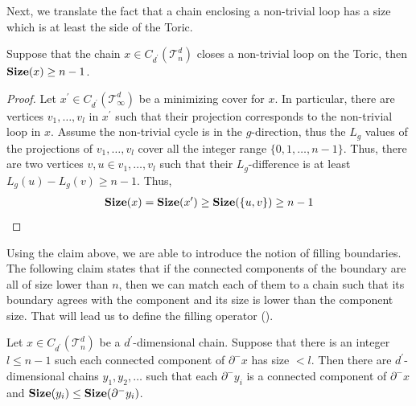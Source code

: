 Next, we translate the fact that a chain enclosing a non-trivial loop has a size which is at least the side of the Toric.
\begin{claim}
  \label{claim:sizenont}
Suppose that the chain $x \in C_{d^{\prime}}(\mathcal{T}_n^d)$ closes a non-trivial loop on the Toric, then $\mathbf{Size}(x) \ge n - 1$.
\end{claim}
\begin{proof}
  Let $x^{\prime} \in C_{d^{\prime}}(\mathcal T_\infty^d)$ be a minimizing cover for $x$. In particular, there are vertices $v_{1}, \ldots, v_{l}$ in $x^{\prime}$ such that their projection corresponds to the non-trivial loop in $x$. Assume the non-trivial cycle is in the $g$-direction, thus the $L_{g}$ values of the projections of $v_{1}, \ldots, v_{l}$ cover all the integer range $\{0,1,\ldots, n-1\}$. Thus, there are two vertices $v,u \in v_{1},\ldots,v_{l}$ such that their $L_{g}$-difference is at least $L_{g}(u) - L_{g}(v) \ge n-1$. Thus,
  \begin{equation*}
    \begin{split}
      \mathbf{Size}(x) = \mathbf{Size}(x^{\prime}) \ge \mathbf{Size}(\{u,v\}) \ge n-1
    \end{split}
  \end{equation*}
\end{proof}




Using the claim above, we are able to introduce the notion of filling boundaries. The following claim states that if the connected components of the boundary are all of size lower than $n$, then we can match each of them to a chain such that its boundary agrees with the component and its size is lower than the component size. That will lead us to define the filling operator ().
\begin{claim}
  \label{claim:fillchain}
  Let $x \in C_{d^{\prime}}(\mathcal{T}_n^d)$ be a $d^{\prime}$-dimensional chain. Suppose that there is an integer $l \le n-1$ such each connected component of $\partial^{-}x$ has size $ < l$. Then there are $d^{\prime}$-dimensional chains $y_{1}, y_{2}, \ldots$ such that each $\partial^{-}y_{i}$ is a connected component of $\partial^{-}x$ and $\mathbf{Size}(y_{i}) \le \mathbf{Size}(\partial^{-}y_{i})$.
\end{claim}

